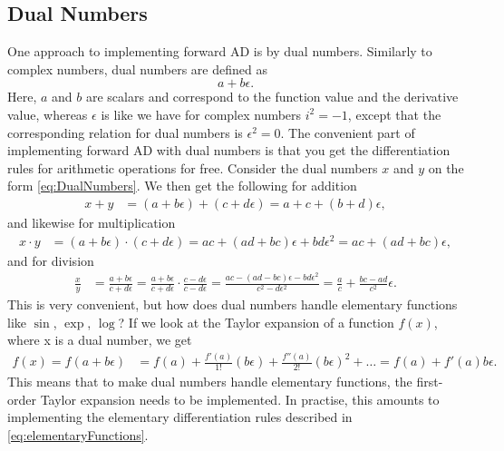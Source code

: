 \subsection{Dual Numbers}
\label{sec:DualNumbers}
One approach to implementing forward AD is by dual numbers. Similarly to complex numbers, dual numbers are defined as 
\begin{equation}
    a + b\epsilon.
    \label{eq:DualNumbers}
\end{equation}
Here, $a$ and $b$ are scalars and correspond to the function value and the derivative value, whereas $\epsilon$ is like we have for complex numbers $i^2 = -1$, except that the corresponding relation for dual numbers is $\epsilon^2 = 0$. The convenient part of implementing forward AD with dual numbers is that you get the differentiation rules for arithmetic operations for free. Consider the dual numbers $x$ and $y$ on the form \eqref{eq:DualNumbers}. We then get the following for addition
\begin{align*}
x+y &= (a+b\epsilon)+(c+d\epsilon) = a+c+(b+d)\epsilon,
\end{align*}
and likewise for multiplication
\begin{align*}
x\cdot y &= (a+b\epsilon)\cdot(c+d\epsilon)%
    = ac + (ad + bc)\epsilon + bd\epsilon^2 %
    = ac + (ad + bc)\epsilon,
\end{align*}
and for division
\begin{align*}
\frac{x}{y} &= \frac{a+b\epsilon}{c+d\epsilon}%
    =\frac{a+b\epsilon}{c+d\epsilon} \cdot \frac{c-d\epsilon}{c-d\epsilon}%
    =\frac{ac-(ad-bc)\epsilon-bd\epsilon^2}{c^2-d\epsilon^2}%
    =\frac{a}{c} + \frac{bc-ad}{c^2}\epsilon.
\end{align*}
This is very convenient, but how does dual numbers handle elementary functions like $\sin$, $\exp$, $\log$? If we look at the Taylor expansion of a function $f(x)$, where x is a dual number, we get
\begin{align*}
    f(x) = f(a+b\epsilon) &= f(a) + \frac{f'(a)}{1!}(b\epsilon) + \frac{f''(a)}{2!}(b\epsilon)^2+\dots%
        =f(a) + f'(a)b\epsilon.
\end{align*}
This means that to make dual numbers handle elementary functions, the first-order Taylor expansion needs to be implemented. In practise, this amounts to implementing the elementary differentiation rules described in \eqref{eq:elementaryFunctions}. 

